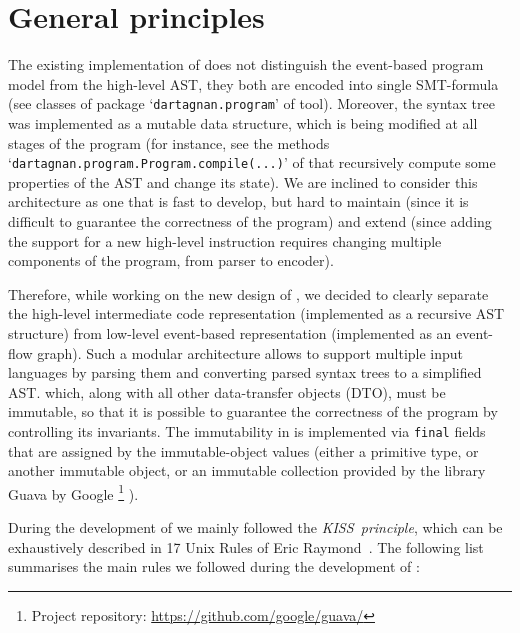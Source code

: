 \section{General principles}
\label{ch:impl:principles}

The existing implementation of \porthos[1] does not distinguish the event-based program model from the high-level AST, they both are encoded into single SMT-formula (see classes of package `\texttt{dartagnan.program}' of \porthos tool).
Moreover, the syntax tree was implemented as a mutable data structure, which is being modified at all stages of the program (for instance, see the methods `\texttt{dartagnan.program.Program.compile(...)}' of \porthos{} that recursively compute some properties of the AST and change its state).
We are inclined to consider this architecture as one that is fast to develop, but hard to maintain (since it is difficult to guarantee the correctness of the program) and extend (since adding the support for a new high-level instruction requires changing multiple components of the program, from parser to encoder).


Therefore, while working on the new design of \porthos[2], we decided to clearly separate the high-level intermediate code representation (implemented as a recursive AST structure) from low-level event-based representation (implemented as an event-flow graph).
Such a modular architecture allows to support multiple input languages by parsing them and converting parsed syntax trees to a simplified AST. which, along with all other data-transfer objects (DTO), must be immutable, so that it is possible to guarantee the correctness of the program by controlling its invariants.
The immutability in \porthos[2] is implemented via \texttt{final} fields that are assigned by the immutable-object values (either a primitive type, or another immutable object, or an immutable collection provided by the library Guava by Google%
\footnote{Project repository: \url{https://github.com/google/guava/}}%
).

During the development of \porthos[2] we mainly followed the \textit{KISS~principle}, which can be exhaustively described in 17 Unix Rules of Eric Raymond~\cite{raymond2003art}.%
The following list summarises the main rules we followed during the development of \porthos[2]:

